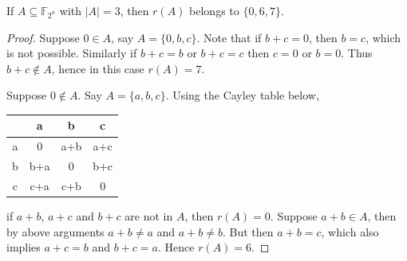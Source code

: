 \documentclass[10pt,a4paper]{amsart}
\begin{document}
	\begin{prop}\label{3_subsset}
		If $A\subseteq \mathbb{F}_{2^n}$ with $|A|=3$, then $r(A)$ belongs to $\{0,6,7\}$.
	\end{prop}

	\begin{proof}
		Suppose $0\in A$, say $A=\{0,b,c\}$. Note that if $b+c=0$, then $b=c$, which is not possible. Similarly if $b+c=b$ or $b+c=c$ then $c=0$ or $b=0$. Thus $b+c\notin A$, hence in this case $r(A)=7$.
		
		Suppose $0\notin A$. Say $A=\{a,b,c\}$. Using the Cayley table below,\\
		\begin{center}
			\begin{tabular}{c||c|c|c}
				& a & b & c \\
				\hline
				\hline
				a & 0 & a+b & a+c \\
				\hline
				b & b+a & 0 & b+c \\
				\hline
				c & c+a & c+b & 0 \\
			\end{tabular}
		\end{center}
		
		if $a+b$, $a+c$ and $b+c$ are not in $A$, then $r(A)=0$. Suppose $a+b\in A$, then by above arguments $a+b\neq a$ and $a+b\neq b$. But then $a+b=c$, which also implies $a+c=b$ and $b+c=a$. Hence $r(A)=6$.
	\end{proof}
\end{document}
